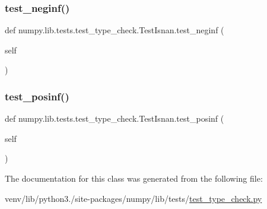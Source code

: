 \subsubsection{\texorpdfstring{test\+\_\+neginf()}{test\_neginf()}}
{\footnotesize\ttfamily def numpy.\+lib.\+tests.\+test\+\_\+type\+\_\+check.\+Test\+Isnan.\+test\+\_\+neginf (\begin{DoxyParamCaption}\item[{}]{self }\end{DoxyParamCaption})}

\mbox{\label{classnumpy_1_1lib_1_1tests_1_1test__type__check_1_1TestIsnan_a54b7c16921b6daaad0798b611edccc9c}} 
\subsubsection{\texorpdfstring{test\+\_\+posinf()}{test\_posinf()}}
{\footnotesize\ttfamily def numpy.\+lib.\+tests.\+test\+\_\+type\+\_\+check.\+Test\+Isnan.\+test\+\_\+posinf (\begin{DoxyParamCaption}\item[{}]{self }\end{DoxyParamCaption})}



The documentation for this class was generated from the following file\+:\begin{DoxyCompactItemize}
\item 
venv/lib/python3./site-\/packages/numpy/lib/tests/\hyperlink{test__type__check_8py}{test\+\_\+type\+\_\+check.\+py}\end{DoxyCompactItemize}
